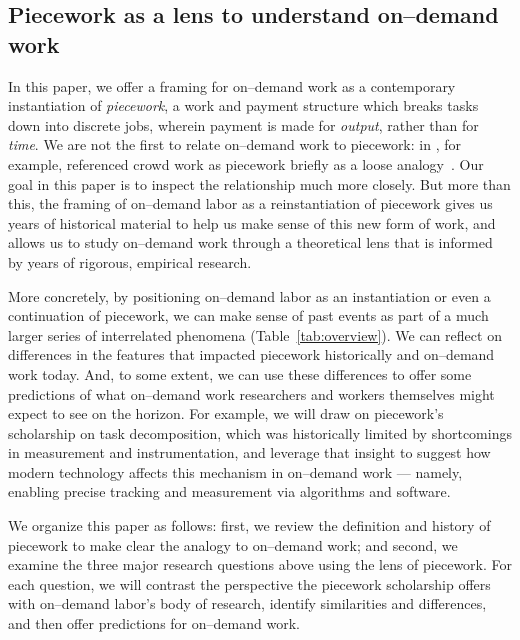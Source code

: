 \documentclass[pn4226]{subfiles}
\begin{document}
\subsection{Piecework as a lens to understand on--demand work}
In this paper, we offer a framing for on--demand work as a contemporary instantiation of \textit{piecework},
a work and payment structure which breaks tasks down into discrete jobs,
wherein payment is made for \textit{output}, rather than for \textit{time}.
We are not the first to relate on--demand work to piecework: in \citeyear{crowdworkFuture}, for example,
\citeauthor{crowdworkFuture} referenced crowd work as piecework briefly
as a loose analogy~\cite{crowdworkFuture}.
Our goal in this paper is to inspect the relationship much more closely.
But more than this,
the framing of on--demand labor as a reinstantiation of piecework 
gives us years of historical material to help us make sense of this new form of work, and
allows us to study on--demand work through a theoretical lens that is informed by years of rigorous, empirical research.

More concretely, by positioning on--demand labor as
an instantiation or even a continuation of piecework, we can make sense of past events as part of a much larger series of interrelated phenomena (Table~\ref{tab:overview}).
We can reflect on differences in the features that impacted piecework historically and on--demand work today.
And, to some extent, we can use these differences to offer some predictions of what on--demand work researchers
and workers themselves
might expect to see on the horizon.
For example, we will draw on piecework's scholarship on task decomposition,
which was historically limited by shortcomings in measurement and instrumentation, and
leverage that insight to suggest how modern technology affects this mechanism in on--demand work
--- namely, enabling precise tracking and measurement via algorithms and software.

We organize this paper as follows:
first, we review the definition and history of piecework
to make clear the analogy to on--demand work;
and second, we examine the three major research questions above using the lens of piecework. 
For each question, we will
contrast the perspective the piecework scholarship offers with on--demand labor's body of research,
identify similarities and differences, and then
offer predictions for on--demand work.

\onlyinsubfile{
  \printbibliography
}
\end{document}
